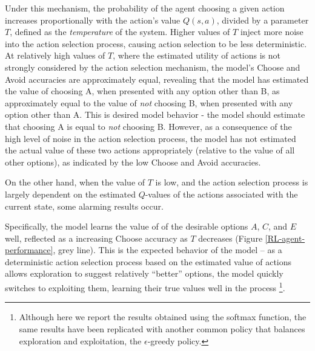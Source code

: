 \documentclass[10pt,letterpaper]{article}
\begin{document}
{\color{red} Under this mechanism, the probability of the agent choosing a given action increases proportionally with the action's value $Q(s,a)$, divided by a parameter $T$, defined as the \emph{temperature} of the system. Higher values of $T$ inject more noise into the action selection process, causing action selection to be less deterministic. At relatively high values of $T$, where the estimated utility of actions is not strongly considered by the action selection mechanism, the model's Choose and Avoid accuracies are approximately equal, revealing that the model has estimated the value of choosing A, when presented with any option other than B, as approximately equal to the value of \emph{not} choosing B, when presented with any option other than A. This is desired model behavior - the model should estimate that choosing A is equal to \emph{not} choosing B. However, as a consequence of the high level of noise in the action selection process, the model has not estimated the actual value of these two actions appropriately (relative to the value of all other options), as indicated by the low Choose and Avoid accuracies. 

On the other hand, when the value of $T$ is low, and the action selection process is largely dependent on the estimated $Q$-values of the actions associated with the current state, some alarming results occur.} 

Specifically, the model learns the value of of the desirable options $A$, $C$, and $E$ well, reflected as a {\color{red} increasing} Choose accuracy as $T$ {\color{red} decreases} (Figure \ref{RL-agent-performance}, grey line). This is the expected behavior of the model -- {\color{red} as a deterministic action selection process based on the estimated value of actions allows exploration} to suggest relatively ``better'' options, the model quickly switches to exploiting them, learning their true values well in the process \footnote{Although here we report the results obtained using the {\color{red} softmax function}, the same results have been replicated with another common policy that balances exploration and exploitation, the $\epsilon$-greedy policy.}. 
\end{document}
